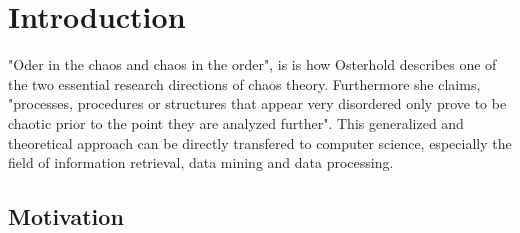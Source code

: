 \chapter{Introduction\label{cha:chapter1}}

"Oder in the chaos and chaos in the order", is is how Osterhold\cite[p. 24f]{osterhold_2013} describes one of the two essential research directions of chaos theory. Furthermore she claims, "processes, procedures or structures that appear very disordered only prove to be chaotic prior to the point they are analyzed further". This generalized and theoretical approach can be directly transfered to computer science, especially the field of information retrieval, data mining and data processing. 

\section{Motivation\label{sec:moti}}

